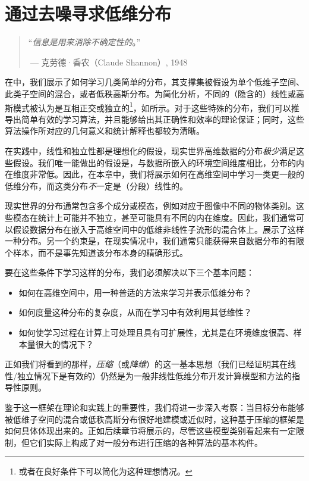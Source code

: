 \documentclass[../../book-main_zh.tex]{subfiles}
\begin{document}
\chapter{通过去噪寻求低维分布}
\label{ch:denoising}

\begin{quote}
    \hfill  ``{\textit{信息是用来消除不确定性的}}。''

    \(~\)\hfill --- 克劳德·香农（Claude Shannon）, 1948
\end{quote}
\vspace{5mm}

在中，我们展示了如何学习几类简单的分布，其支撑集被假设为单个低维子空间、此类子空间的混合，或者低秩高斯分布。为简化分析，不同的（隐含的）线性或高斯模式被认为是互相正交或独立的\footnote{或者在良好条件下可以简化为这种理想情况。}，如所示。对于这些特殊的分布，我们可以推导出简单有效的学习算法，并且能够给出其正确性和效率的理论保证；同时，这些算法操作所对应的几何意义和统计解释也都较为清晰。

在实践中，线性和独立性都是理想化的假设，现实世界高维数据的分布\textit{极少}满足这些假设。我们唯一能做出的假设是，与数据所嵌入的环境空间维度相比，分布的内在维度非常低。因此，在本章中，我们将展示如何在高维空间中学习一类更一般的低维分布，而这类分布\textit{不}一定是（分段）线性的。

现实世界的分布通常包含多个成分或模态，例如对应于图像中不同的物体类别。这些模态在统计上可能并不独立，甚至可能具有不同的内在维度。因此，我们通常可以假设数据分布在嵌入于高维空间中的低维非线性子流形的混合体上。展示了这样一种分布。另一个约束是，在现实情况中，我们通常只能获得来自数据分布的有限个样本，而不是事先知道该分布本身的精确形式。

要在这些条件下学习这样的分布，我们必须解决以下三个基本问题：
\begin{itemize}
    \item 如何在高维空间中，用一种普适的方法来学习并表示低维分布？
    \item 如何度量这种分布的复杂度，从而在学习中有效利用其低维性？
    \item 如何使学习过程在计算上可处理且具有可扩展性，尤其是在环境维度很高、样本量很大的情况下？
\end{itemize}
正如我们将看到的那样，\textit{压缩}（或\textit{降维}）的这一基本思想（我们已经证明其在线性/独立情况下是有效的）仍然是为一般非线性低维分布开发计算模型和方法的指导性原则。

鉴于这一框架在理论和实践上的重要性，我们将进一步深入考察：当目标分布能够被低维子空间的混合或低秩高斯分布很好地建模或近似时，这种基于压缩的框架是如何具体体现出来的。正如后续章节将展示的，尽管这些模型类别看起来有一定限制，但它们实际上构成了对一般分布进行压缩的各种算法的基本构件。
\end{document}
